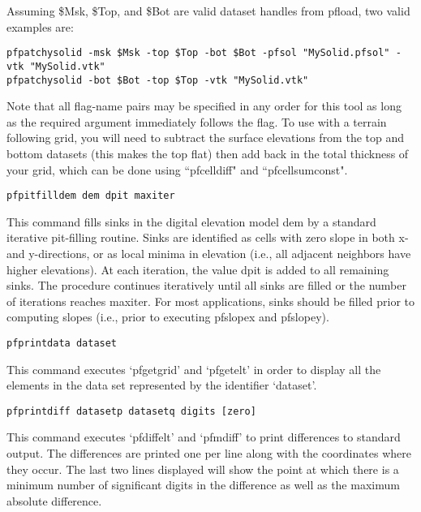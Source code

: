 \begin{description}
Assuming \$Msk, \$Top, and \$Bot are valid dataset handles from pfload, two valid examples are:
\begin{display}
\begin{verbatim}
pfpatchysolid -msk $Msk -top $Top -bot $Bot -pfsol "MySolid.pfsol" -vtk "MySolid.vtk"
pfpatchysolid -bot $Bot -top $Top -vtk "MySolid.vtk"
\end{verbatim}
\end{display}
Note that all flag-name pairs may be specified in any order for this tool as long as the required argument immediately follows the flag. To use with a terrain following grid, you will need to subtract the surface elevations from the top and bottom datasets (this makes the top flat) then add back in the total thickness of your grid, which can be done using ``pfcelldiff" and ``pfcellsumconst".


\item{\begin{verbatim}pfpitfilldem dem dpit maxiter \end{verbatim}}
This command fills sinks in the digital elevation model dem by a standard iterative
pit-filling routine. Sinks are identified as cells with zero slope in both x- and
y-directions, or as local minima in elevation (i.e., all adjacent neighbors have
higher elevations). At each iteration, the value dpit is added to all remaining
sinks. The procedure continues iteratively until all sinks are filled or the number
of iterations reaches maxiter. For most applications, sinks should be filled prior
to computing slopes (i.e., prior to executing pfslopex and pfslopey).


\item{\begin{verbatim}pfprintdata dataset\end{verbatim}}
This command executes `pfgetgrid' and `pfgetelt' in order to display
all the elements in the data set represented by the identifier
`dataset'.


\item{\begin{verbatim}pfprintdiff datasetp datasetq digits [zero]\end{verbatim}}
This command executes `pfdiffelt' and `pfmdiff' to print differences
to standard output.  The differences are printed one per line along
with the coordinates where they occur.  The last two lines displayed
will show the point at which there is a minimum number of significant
digits in the difference as well as the maximum absolute difference.



\end{description}
